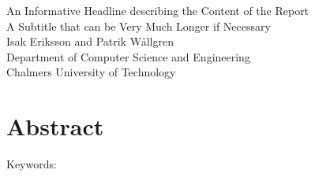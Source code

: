 An Informative Headline describing the Content of the Report\\
A Subtitle that can be Very Much Longer if Necessary\\
Isak Eriksson and Patrik Wållgren\\
Department of Computer Science and Engineering\\
Chalmers University of Technology \setlength{\parskip}{0.5cm}

\thispagestyle{plain}			%
\setlength{\parskip}{0pt plus 1.0pt}
\section*{Abstract}
 

\vfill
Keywords: 

\newpage				%
\thispagestyle{empty}
\mbox{}